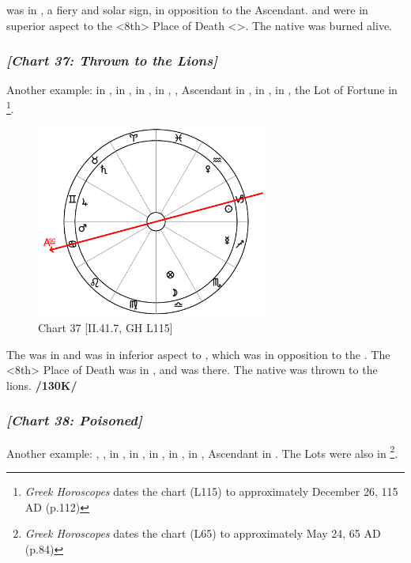 \noindent \Mars\xspace was in \Leo, a fiery and solar sign, in opposition to the Ascendant. \Saturn\xspace and \Mercury\xspace were in superior aspect to the <8th> Place of Death <\Pisces>. The native was burned alive.
\newpage
\subsubsection{\textit{[Chart 37: Thrown to the Lions]}}
Another example: \Sun\xspace in \Capricorn, \Moon\xspace in \Libra, \Saturn\xspace in \Taurus, \Jupiter\xspace in \Gemini, \Mars, Ascendant in \Cancer, \Venus\xspace in \Aquarius, \Mercury\xspace in \Sagittarius, the Lot of Fortune in \Libra
\footnote{\textit{Greek Horoscopes} dates the chart (L115) to approximately December 26, 115 AD (p.112)}. 

\clearpage
\begin{figure}
\centering
\vspace{-20pt}
\includegraphics[width=0.68\textwidth]{charts/2_41_7}
\caption{Chart 37 [II.41.7, GH L115]}
\label{fig:chart37}
\end{figure}

The \Moon\xspace was in \Libra\xspace and was in inferior aspect to \Mars, which was in opposition to the \Sun. The <8th> Place of Death was in \Taurus, and \Saturn\xspace was there. The native was thrown to the lions. \textbf{/130K/} 
\newpage
\subsubsection{\textit{[Chart 38: Poisoned]}}
Another example: \Sun, \Moon, \Mercury\xspace in \Gemini, \Saturn\xspace in \Leo, \Jupiter\xspace in \Pisces, \Mars\xspace in \Cancer, \Venus\xspace in \Taurus, Ascendant in \Capricorn. The Lots were also in \Capricorn
\footnote{\textit{Greek Horoscopes} dates the chart (L65) to approximately May 24, 65 AD (p.84)}. 
 
